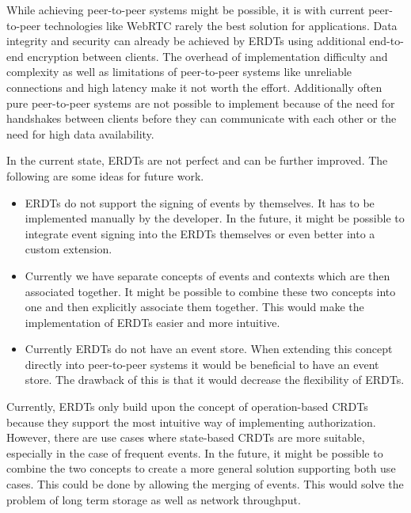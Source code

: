 \documentclass[
	english,
	ruledheaders=section,   %
	class=report,		    %
	thesis={type=bachelor}, %
	accentcolor=9c,			%
	custommargins=true,    %
	marginpar=false,        %
	parskip=half-,          %
	fontsize=11pt,          %
]{tudapub}
\begin{document}
While achieving peer-to-peer systems might be possible, it is with current peer-to-peer technologies like WebRTC rarely the best solution for applications. Data integrity and security can already be achieved by ERDTs using additional end-to-end encryption between clients. The overhead of implementation difficulty and complexity as well as limitations of peer-to-peer systems like unreliable connections and high latency make it not worth the effort. Additionally often pure peer-to-peer systems are not possible to implement because of the need for handshakes between clients before they can communicate with each other or the need for high data availability.

In the current state, ERDTs are not perfect and can be further improved. The following are some ideas for future work.

\begin{itemize}
  \item ERDTs do not support the signing of events by themselves. It has to be implemented manually by the developer. In the future, it might be possible to integrate event signing into the ERDTs themselves or even better into a custom extension.
  \item Currently we have separate concepts of events and contexts which are then associated together. It might be possible to combine these two concepts into one and then explicitly associate them together. This would make the implementation of ERDTs easier and more intuitive.
  \item Currently ERDTs do not have an event store. When extending this concept directly into peer-to-peer systems it would be beneficial to have an event store. The drawback of this is that it would decrease the flexibility of ERDTs.
\end{itemize}

Currently, ERDTs only build upon the concept of operation-based CRDTs because they support the most intuitive way of implementing authorization. However, there are use cases where state-based CRDTs are more suitable, especially in the case of frequent events. In the future, it might be possible to combine the two concepts to create a more general solution supporting both use cases. This could be done by allowing the merging of events. This would solve the problem of long term storage as well as network throughput. 

\printbibliography
\end{document}
